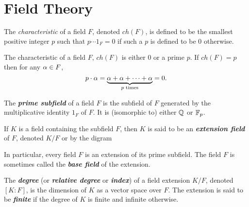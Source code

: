 \section{Field Theory}
\setcounter{thm}{0}

\begin{defn}
The \textit{characteristic} of a field $F$, denoted $ch(F)$, is defined to be the smallest positive integer $p$ such that $p\cdots 1_F = 0$ if such a $p$ is defined to be 0 otherwise. 
\end{defn}

\nl

\begin{prop}
The characteristic of a field $F$, $ch(F)$ is either 0 or a prime $p$. If $ch(F) = p$ then for any $\alpha \in F$,
\[p\cdot \alpha = \underbrace{\alpha + \alpha + \cdots + \alpha}_{\text{$p$ times}} = 0.\]
\end{prop}

\nl

\begin{defn}
The \textit{\textbf{prime subfield}} of a field $F$ is the subfield of $F$ generated by the multiplicative identity $1_F$ of $F$. It is (isomorphic to) either $\mathbb{Q}$ or $\mathbb{F}_p$.
\end{defn}

\nl

\begin{defn}
If $K$ is a field containing the subfield $F$, then $K$ is said to be an \textit{\textbf{extension field}} of $F$, denoted $K/F$ or by the digram 
\begin{center}
\end{center}
In particular, every field $F$ is an extension of its prime subfield. The field $F$ is sometimes called the \textit{\textbf{base field}} of the extension.
\end{defn}

\nl

\begin{defn}
The \textit{\textbf{degree}} (or \textit{\textbf{relative degree}} or \textit{\textbf{index}}) of a field extension $K/F$, denoted $[K:F]$, is the dimension of $K$ as a vector space over $F$. The extension is said to be \textit{\textbf{finite}} if the degree of $K$ is finite and infinite otherwise.
\end{defn}

